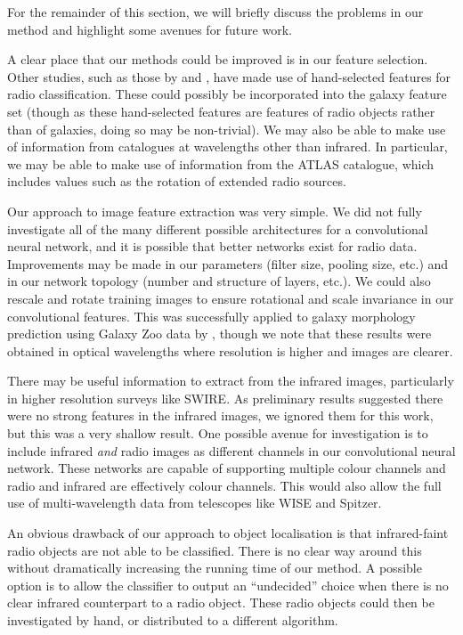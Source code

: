   For the remainder of this section, we will briefly discuss the problems in our
  method and highlight some avenues for future work.

  A clear place that our methods could be improved is in our feature selection.
  Other studies, such as those by \citet{proctor06} and \citet{fan15}, have made
  use of hand-selected features for radio classification. These could possibly
  be incorporated into the galaxy feature set (though as these hand-selected
  features are features of radio objects rather than of galaxies, doing so may
  be non-trivial). We may also be able to make use of information from
  catalogues at wavelengths other than infrared. In particular, we may be able
  to make use of information from the ATLAS catalogue, which includes values
  such as the rotation of extended radio sources.

  Our approach to image feature extraction was very simple. We did not fully
  investigate all of the many different possible architectures for a
  convolutional neural network, and it is possible that better networks exist
  for radio data. Improvements may be made in our parameters (filter size,
  pooling size, etc.) and in our network topology (number and structure of
  layers, etc.). We could also rescale and rotate training images to ensure
  rotational and scale invariance in our convolutional features. This was
  successfully applied to galaxy morphology prediction using Galaxy Zoo data by
  \citet{dieleman15}, though we note that these results were obtained in optical
  wavelengths where resolution is higher and images are clearer.

  There may be useful information to extract from the infrared images,
  particularly in higher resolution surveys like SWIRE. As preliminary results
  suggested there were no strong features in the infrared images, we ignored
  them for this work, but this was a very shallow result. One possible avenue
  for investigation is to include infrared \emph{and} radio images as different
  channels in our convolutional neural network. These networks are capable of
  supporting multiple colour channels and radio and infrared are effectively
  colour channels. This would also allow the full use of multi-wavelength
  data from telescopes like WISE and Spitzer.

  An obvious drawback of our approach to object localisation is that
  infrared-faint radio objects are not able to be classified. There is no clear
  way around this without dramatically increasing the running time of our
  method. A possible option is to allow the classifier to output an
  ``undecided'' choice when there is no clear infrared counterpart to a radio
  object. These radio objects could then be investigated by hand, or distributed
  to a different algorithm.

